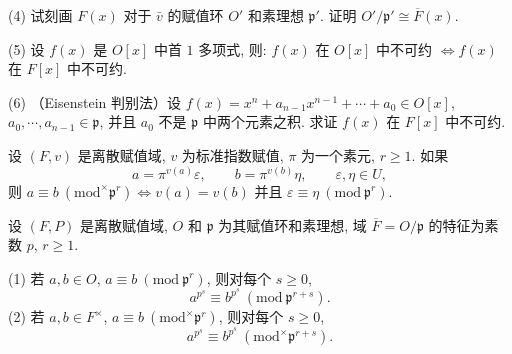 \begin{Exercises}
(4) 试刻画 $F(x)$ 对于 $\bar{v}$ 的赋值环 $O'$ 和素理想 $\mathfrak{p}'$. 证明 $O'/\mathfrak{p}'\cong\overline{F}(x)$.

(5) 设 $f(x)$ 是 $O[x]$ 中首 $1$ 多项式, 则: $f(x)$ 在 $O[x]$ 中不可约 $\Leftrightarrow f(x)$ 在 $F[x]$ 中不可约.

(6) （Eisenstein 判别法）设 $f(x)=x^n+a_{n-1}x^{n-1}+\cdots+a_0\in O[x]$, $a_0,\cdots,a_{n-1}\in\mathfrak{p}$, 并且 $a_0$ 不是 $\mathfrak{p}$ 中两个元素之积. 求证 $f(x)$ 在 $F[x]$ 中不可约.

\item 设 $(F,v)$ 是离散赋值域, $v$ 为标准指数赋值, $\pi$ 为一个素元, $r\geqslant 1$. 如果
\[
  a=\pi^{v(a)}\varepsilon,\qquad b=\pi^{v(b)}\eta,\qquad\varepsilon,\eta\in U,
\]
则 $a\equiv b\ (\mathrm{mod}^{\times}\mathfrak{p}^r)\Leftrightarrow v(a)=v(b)$ 并且 $\varepsilon\equiv\eta\ (\mathrm{mod}\ \mathfrak{p}^r)$.

\item 设 $(F,P)$ 是离散赋值域, $O$ 和 $\mathfrak{p}$ 为其赋值环和素理想, 域 $\overline{F}=O/\mathfrak{p}$ 的特征为素数 $p$, $r\geqslant 1$.

(1) 若 $a,b\in O$, $a\equiv b\ (\mathrm{mod}\ \mathfrak{p}^r)$, 则对每个 $s\geqslant 0$,
\[
  a^{p^s}\equiv b^{p^s}\ (\mathrm{mod}\ \mathfrak{p}^{r+s}).
\]
(2) 若 $a,b\in F^{\times}$, $a\equiv b\ (\mathrm{mod}^{\times}\mathfrak{p}^r)$, 则对每个 $s\geqslant 0$,
\[
  a^{p^s}\equiv b^{p^s}\ (\mathrm{mod}^{\times}\mathfrak{p}^{r+s}).
\]
\end{Exercises}
